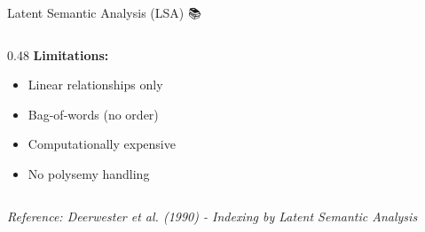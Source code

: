 \documentclass[aspectratio=169]{beamer}
\begin{document}
\begin{frame}[shrink=10]{Latent Semantic Analysis (LSA) 📚}
\begin{columns}[T]
\begin{column}{0.48\textwidth}
\vspace{0.5em}
\textbf{Limitations:}
\begin{itemize}\setlength{\itemsep}{0pt}
    \item Linear relationships only
    \item Bag-of-words (no order)
    \item Computationally expensive
    \item No polysemy handling
\end{itemize}
\end{column}
\end{columns}

\vspace{0.5em}
\small
\textit{Reference: Deerwester et al. (1990) - Indexing by Latent Semantic Analysis}
\end{frame}
\end{document}
